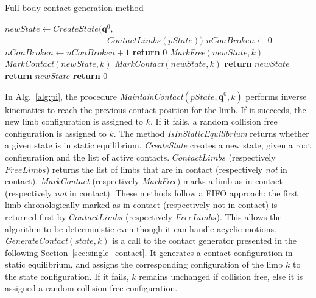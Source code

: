 \documentclass[journal]{IEEEtran}
\begin{document}
\begin{algorithm}[!tbp]
\caption{Full body contact generation method} \label{interpolate}
	\begin{algorithmic}[1]
		\State $newState \gets {CreateState}(\mathbf{q}^0,$ 
        \State $\quad \quad \quad \quad  \quad  \quad  \quad  \quad  \quad \quad  \quad \quad\!\! ContactLimbs(pState))$
		\State $nConBroken \gets 0$
				\State $nConBroken \gets nConBroken +1$
					\State \textbf{return} $0$
				\EndIf				
				\State \textit{MarkFree}$(newState,k)$
			\Else 					
				\State \textit{MarkContact}$(newState,k)$
			\EndIf
		\EndFor
				\State \textit{MarkContact}$(newState,k)$
				\State \textbf{return} $newState$
			\EndIf
		\EndFor
			\State \textbf{return} $newState$
		\Else
			\State \textbf{return} $0$
		\EndIf
	\EndFunction
\end{algorithmic}
\label{alg:pi}
\end{algorithm}

In Alg.~\ref{alg:pi}, the procedure \textit{MaintainContact}$(pState,\mathbf{q}^0,k)$ performs inverse kinematics to reach the previous contact position for the limb.
If it succeeds, the new limb configuration is assigned to $k$. If it fails, a random collision free configuration is assigned to $k$.
The method \textit{IsInStaticEquilibrium} returns whether a given state is in static equilibrium. \textit{CreateState} creates a new state, given
a root configuration and the list of active contacts.
$ContactLimbs$ (respectively $FreeLimbs$) returns the list of limbs that are in contact (respectively \textit{not} in contact).  \textit{MarkContact} (respectively \textit{MarkFree})  marks a limb as in contact (respectively \textit{not} in contact). These methods follow a FIFO approach: the first limb chronologically marked as in contact (respectively not in contact) is returned first by $ContactLimbs$ (respectively $FreeLimbs$). This allows the algorithm to be deterministic even though it can handle acyclic motions.
%
%
\textit{GenerateContact}$(state,k)$ is a call to the contact generator presented in the following Section~\ref{sec:single_contact}.
It generates a contact configuration in static equilibrium, and assigns the corresponding configuration of the limb $k$ to the state configuration.
If it fails, $k$ remains unchanged if collision free, else it is assigned a random collision free configuration.
\end{document}
